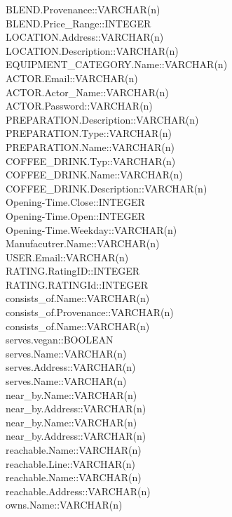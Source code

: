 BLEND.Provenance::VARCHAR(n)\\
BLEND.Price\_Range::INTEGER\\
LOCATION.Address::VARCHAR(n)\\
LOCATION.Description::VARCHAR(n)\\
EQUIPMENT\_CATEGORY.Name::VARCHAR(n)\\
ACTOR.Email::VARCHAR(n)\\
ACTOR.Actor\_Name::VARCHAR(n)\\
ACTOR.Password::VARCHAR(n)\\
PREPARATION.Description::VARCHAR(n)\\
PREPARATION.Type::VARCHAR(n)\\
PREPARATION.Name::VARCHAR(n)\\
COFFEE\_DRINK.Typ::VARCHAR(n)\\
COFFEE\_DRINK.Name::VARCHAR(n)\\
COFFEE\_DRINK.Description::VARCHAR(n)\\
Opening-Time.Close::INTEGER\\
Opening-Time.Open::INTEGER\\
Opening-Time.Weekday::VARCHAR(n)\\
Manufacutrer.Name::VARCHAR(n)\\
USER.Email::VARCHAR(n)\\
RATING.RatingID::INTEGER\\
RATING.RATINGId::INTEGER\\
consists\_of.Name::VARCHAR(n)\\
consists\_of.Provenance::VARCHAR(n)\\
consists\_of.Name::VARCHAR(n)\\
serves.vegan::BOOLEAN\\
serves.Name::VARCHAR(n)\\
serves.Address::VARCHAR(n)\\
serves.Name::VARCHAR(n)\\
near\_by.Name::VARCHAR(n)\\
near\_by.Address::VARCHAR(n)\\
near\_by.Name::VARCHAR(n)\\
near\_by.Address::VARCHAR(n)\\
reachable.Name::VARCHAR(n)\\
reachable.Line::VARCHAR(n)\\
reachable.Name::VARCHAR(n)\\
reachable.Address::VARCHAR(n)\\
owns.Name::VARCHAR(n)\\
